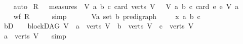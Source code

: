 \begin{isabellebody}
%
\isadelimproof
\ \ %
\endisadelimproof
%
\isatagproof
{}\isamarkupfalse%
\ auto%
\endisatagproof
{\isafoldproof}%
%
\isadelimproof
\isanewline
%
\endisadelimproof
{}\isamarkupfalse%
\isanewline
%
\isadelimproof
%
\endisadelimproof
%
\isatagproof
{}\isamarkupfalse%
\isanewline
{}\isamarkupfalse%
\ {\isacharquery}{\kern0pt}R\ {\isacharequal}{\kern0pt}\ {\isachardoublequoteopen}\ measures\ {\isacharbrackleft}{\kern0pt}{\isacharparenleft}{\kern0pt}\ {\isasymlambda}{\isacharparenleft}{\kern0pt}V{\isacharcomma}{\kern0pt}\ a{\isacharcomma}{\kern0pt}\ b{\isacharcomma}{\kern0pt}\ c{\isacharparenright}{\kern0pt}{\isachardot}{\kern0pt}\ {\isacharparenleft}{\kern0pt}card\ {\isacharparenleft}{\kern0pt}verts\ V{\isacharparenright}{\kern0pt}{\isacharparenright}{\kern0pt}{\isacharparenright}{\kern0pt}{\isacharcomma}{\kern0pt}\ \ {\isacharparenleft}{\kern0pt}\ {\isasymlambda}{\isacharparenleft}{\kern0pt}V{\isacharcomma}{\kern0pt}\ a{\isacharcomma}{\kern0pt}\ b{\isacharcomma}{\kern0pt}\ c{\isacharparenright}{\kern0pt}{\isachardot}{\kern0pt}\ card\ {\isacharbraceleft}{\kern0pt}e{\isachardot}{\kern0pt}\ e\ {\isasymrightarrow}\isactrlsup {\isacharasterisk}{\kern0pt}\isactrlbsub V\isactrlesub \ a{\isacharbraceright}{\kern0pt}{\isacharparenright}{\kern0pt}{\isacharbrackright}{\kern0pt}\ {\isachardoublequoteclose}\ \ \isanewline
\ \ \isamarkupfalse%
\ {\isachardoublequoteopen}wf\ {\isacharquery}{\kern0pt}R{\isachardoublequoteclose}\isanewline
\ \ \ \ \isamarkupfalse%
\ simp\ \isanewline
{}\isamarkupfalse%
\ \isanewline
\ \ \isamarkupfalse%
\ V{\isacharcolon}{\kern0pt}{\isacharcolon}{\kern0pt}{\isachardoublequoteopen}{\isacharparenleft}{\kern0pt}{\isacharprime}{\kern0pt}a\ set{\isacharcomma}{\kern0pt}\ {\isacharprime}{\kern0pt}b{\isacharparenright}{\kern0pt}\ pre{\isacharunderscore}{\kern0pt}digraph{\isachardoublequoteclose}\ \isanewline
\ \ \isamarkupfalse%
\ x\ a\ b\ c\isanewline
\ \ \isamarkupfalse%
\ bD{\isacharcolon}{\kern0pt}\ {\isachardoublequoteopen}\ {\isasymnot}\ {\isacharparenleft}{\kern0pt}{\isasymnot}\ blockDAG\ V\ {\isasymor}\ a\ {\isasymnotin}\ verts\ V\ {\isasymor}\ b\ {\isasymnotin}\ verts\ V\ {\isasymor}\ c\ {\isasymnotin}\ verts\ V{\isacharparenright}{\kern0pt}{\isachardoublequoteclose}\isanewline
\ \ \isamarkupfalse%
\ \isamarkupfalse%
\ {\isachardoublequoteopen}a\ {\isasymin}\ verts\ V{\isachardoublequoteclose}\ \ \isamarkupfalse%
\ simp\isanewline

\end{isabellebody}
